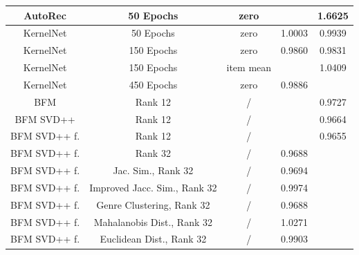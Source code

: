 \documentclass[10pt,conference,compsocconf]{IEEEtran}
\begin{document}
\begin{table}
{\begin{tabular}{|| c | c | c | c | c ||}
            AutoRec              & 50 Epochs                             & zero                    &                        & 1.6625                  \\
            \hline
            KernelNet            & 50 Epochs                             & zero                    & 1.0003                 & 0.9939                  \\
            KernelNet            & 150 Epochs                            & zero                    & 0.9860                 & 0.9831                  \\
            KernelNet            & 150 Epochs                            & item mean               &                        & 1.0409                  \\
            KernelNet            & 450 Epochs                            & zero                    & 0.9886                 &                         \\
            \hline
            BFM                  & Rank 12                               & /                       &                        & 0.9727                  \\
            BFM SVD++            & Rank 12                               & /                       &                        & 0.9664                  \\
            BFM SVD++ f.         & Rank 12                               & /                       &                        & 0.9655                  \\
            BFM SVD++ f.         & Rank 32                               & /                       & 0.9688                 &                         \\
            BFM SVD++ f.         & Jac. Sim., Rank 32                    & /                       & 0.9694                 &                         \\
            BFM SVD++ f.         & Improved Jacc. Sim., Rank 32          & /                       & 0.9974                 &                         \\
            BFM SVD++ f.         & Genre Clustering, Rank 32             & /                       & 0.9688                 &                         \\
            BFM SVD++ f.         & Mahalanobis Dist., Rank 32            & /                       & 1.0271                 &                         \\
            BFM SVD++ f.         & Euclidean Dist., Rank 32              & /                       & 0.9903                 &                         \\

\end{tabular}}
\end{table}
\end{document}
